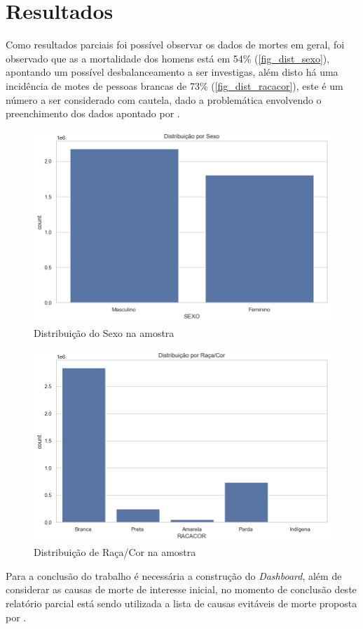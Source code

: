 \chapter{Resultados}

Como resultados parciais foi possível observar os dados de mortes em geral, foi observado que as a mortalidade dos homens está em 54\% (\autoref{fig_dist_sexo}), apontando um possível desbalanceamento a ser investigas, além disto há uma incidência de motes de pessoas brancas de 73\% (\autoref{fig_dist_racacor}), este é um número a ser considerado com cautela, dado a problemática envolvendo o preenchimento dos dados apontado por .

\begin{figure}[H]
	\caption{\label{fig_dist_sexo}Distribuição do Sexo na amostra}
	\begin{center}
		\includegraphics[width=.6\textwidth]{USPSC-img/dist-sexo.png}
	\end{center}
\end{figure}

\begin{figure}[H]
	\caption{\label{fig_dist_racacor}Distribuição de Raça/Cor na amostra}
	\begin{center}
		\includegraphics[width=.6\textwidth]{USPSC-img/dist_racacor.png}
	\end{center}
\end{figure}

Para a conclusão do trabalho é necessária a construção do \textit{Dashboard}, além de considerar as causas de morte de interesse inicial, no momento de conclusão deste relatório parcial está sendo utilizada a lista de causas evitáveis de morte proposta por .

